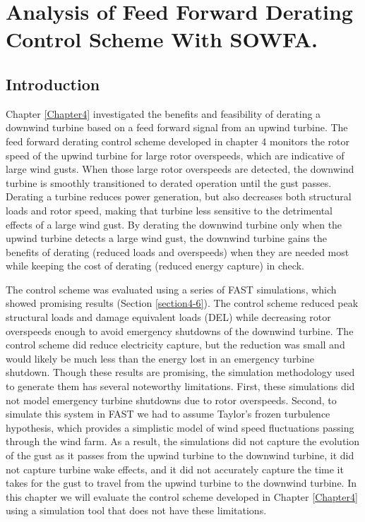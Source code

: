 
\chapter{Analysis of Feed Forward Derating Control Scheme With SOWFA.} %

\label{Chapter6} %



\section{Introduction} \label{section6-1}

Chapter \ref{Chapter4} investigated the benefits and feasibility of derating a downwind turbine based on a feed forward signal from an upwind turbine. The feed forward derating control scheme developed in chapter 4 monitors the rotor speed of the upwind turbine for large rotor overspeeds, which are indicative of large wind gusts. When those large rotor overspeeds are detected, the downwind turbine is smoothly transitioned to derated operation until the gust passes. Derating a turbine reduces power generation, but also decreases both structural loads and rotor speed, making that turbine less sensitive to the detrimental effects of a large wind gust. By derating the downwind turbine only when the upwind turbine detects a large wind gust, the downwind turbine gains the benefits of derating (reduced loads and overspeeds) when they are needed most while keeping the cost of derating (reduced energy capture) in check.

The control scheme was evaluated using a series of FAST simulations, which showed promising results (Section \ref{section4-6}). The control scheme reduced peak structural loads and damage equivalent loads (DEL) while decreasing rotor overspeeds enough to avoid emergency shutdowns of the downwind turbine. The control scheme did reduce electricity capture, but the reduction was small and would likely be much less than the energy lost in an emergency turbine shutdown. Though these results are promising, the simulation methodology used to generate them has several noteworthy limitations. First, these simulations did not model emergency turbine shutdowns due to rotor overspeeds. Second, to simulate this system in FAST we had to assume Taylor's frozen turbulence hypothesis, which provides a simplistic model of wind speed fluctuations passing through the wind farm. As a result, the simulations did not capture the evolution of the gust as it passes from the upwind turbine to the downwind turbine, it did not capture turbine wake effects, and it did not accurately capture the time it takes for the gust to travel from the upwind turbine to the downwind turbine. In this chapter we will evaluate the control scheme developed in Chapter \ref{Chapter4} using a simulation tool that does not have these limitations.

